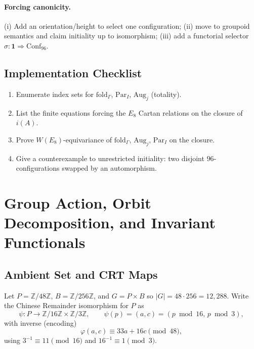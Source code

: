 \documentclass[12pt]{article}
\begin{document}
\paragraph{Forcing canonicity.}
(i) Add an orientation/height to select one configuration; (ii) move to groupoid semantics and claim initiality up to isomorphism; (iii) add a functorial selector $\sigma:\mathbf 1\Rightarrow \mathrm{Conf}_{96}$.

\subsection{Implementation Checklist}
\begin{enumerate}\itemsep2pt
  \item Enumerate index sets for $\mathrm{fold}_{\Gamma}$, $\mathrm{Par}_I$, $\mathrm{Aug}_j$ (totality).
  \item List the finite equations forcing the $E_8$ Cartan relations on the closure of $i(A)$.
  \item Prove $W(E_8)$-equivariance of $\mathrm{fold}_{\Gamma}$, $\mathrm{Aug}_j$, $\mathrm{Par}_I$ on the closure.
  \item Give a counterexample to unrestricted initiality: two disjoint $96$-configurations swapped by an automorphism.
\end{enumerate}


\section{Group Action, Orbit Decomposition, and Invariant Functionals}

\subsection{Ambient Set and CRT Maps}
Let $P=\mathbb Z/48\mathbb Z$, $B=\mathbb Z/256\mathbb Z$, and $G=P\times B$ so $|G|=48\cdot 256=12{,}288$. Write the Chinese Remainder isomorphism for $P$ as
\[
\psi: P\to \mathbb Z/16\mathbb Z\times \mathbb Z/3\mathbb Z,\qquad \psi(p)=(a,c)=(p\bmod 16,\, p\bmod 3),
\]
with inverse (encoding)
\[
\varphi(a,c)\equiv 33a+16c\pmod{48},
\]
using $3^{-1}\equiv 11\pmod{16}$ and $16^{-1}\equiv 1\pmod{3}$.
\end{document}
